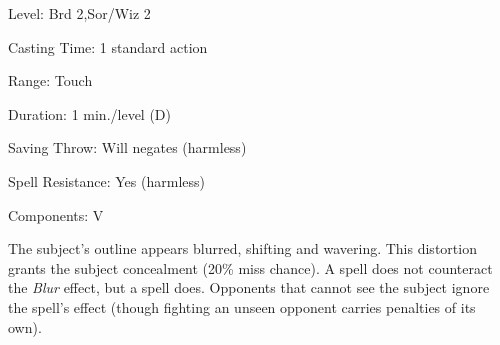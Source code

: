 
\begin{description*}
\item[Level:] Brd 2,Sor/Wiz 2
\item[Casting Time:] 1 standard action
\item[Range:] Touch
\item[Duration:] 1 min./level (D)
\item[Saving Throw:] Will negates (harmless)
\item[Spell Resistance:] Yes (harmless)
\item[Components:] V
\end{description*}

The subject's outline appears blurred, shifting and wavering. This distortion grants
the subject concealment (20\% miss chance).
A  spell does not counteract the \textit{Blur} effect,
but a  spell does.
Opponents that cannot see the subject ignore the spell's effect (though fighting
an unseen opponent carries penalties of its own).